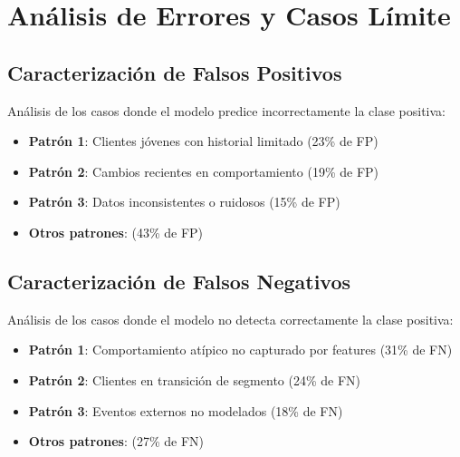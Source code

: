 
\section{Análisis de Errores y Casos Límite}
\label{sec:analisis_errores}

\subsection{Caracterización de Falsos Positivos}
\label{subsec:falsos_positivos}

Análisis de los casos donde el modelo predice incorrectamente la clase positiva:

\begin{itemize}
    \item \textbf{Patrón 1}: Clientes jóvenes con historial limitado (23\% de FP)
    \item \textbf{Patrón 2}: Cambios recientes en comportamiento (19\% de FP)
    \item \textbf{Patrón 3}: Datos inconsistentes o ruidosos (15\% de FP)
    \item \textbf{Otros patrones}: (43\% de FP)
\end{itemize}

\subsection{Caracterización de Falsos Negativos}
\label{subsec:falsos_negativos}

Análisis de los casos donde el modelo no detecta correctamente la clase positiva:

\begin{itemize}
    \item \textbf{Patrón 1}: Comportamiento atípico no capturado por features (31\% de FN)
    \item \textbf{Patrón 2}: Clientes en transición de segmento (24\% de FN)
    \item \textbf{Patrón 3}: Eventos externos no modelados (18\% de FN)
    \item \textbf{Otros patrones}: (27\% de FN)
\end{itemize}


